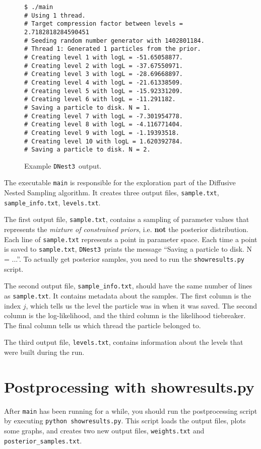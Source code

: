 \documentclass[a4paper, 11pt]{article}
\newcommand{\dnest}{{\tt DNest3}}
\begin{document}
\begin{figure}[h!]
\begin{verbatim}
$ ./main
# Using 1 thread.
# Target compression factor between levels = 2.7182818284590451
# Seeding random number generator with 1402801184.
# Thread 1: Generated 1 particles from the prior.
# Creating level 1 with logL = -51.65058877.
# Creating level 2 with logL = -37.67550971.
# Creating level 3 with logL = -28.69668897.
# Creating level 4 with logL = -21.61338509.
# Creating level 5 with logL = -15.92331209.
# Creating level 6 with logL = -11.291182.
# Saving a particle to disk. N = 1.
# Creating level 7 with logL = -7.301954778.
# Creating level 8 with logL = -4.116771404.
# Creating level 9 with logL = -1.19393518.
# Creating level 10 with logL = 1.620392784.
# Saving a particle to disk. N = 2.
\end{verbatim}
\caption{Example \dnest~output.\label{fig:output}}
\end{figure}

The executable {\tt main} is responsible for the exploration part of the
Diffusive Nested Sampling algorithm. It creates three output files,
{\tt sample.txt}, {\tt sample\_info.txt}, {\tt levels.txt}.

The first output
file, {\tt sample.txt}, contains a sampling of parameter values that
represents the {\it mixture of constrained priors}, i.e. {\bf not} the
posterior distribution. Each line of {\tt sample.txt} represents a point in
parameter space. Each time a point is saved to {\tt sample.txt}, \dnest~prints
the message ``Saving a particle to disk. N = ...''. To actually get posterior
samples, you need to run the {\tt showresults.py} script.

The second output file, {\tt sample\_info.txt}, should have the same number of
lines as {\tt sample.txt}. It contains metadata about the samples. The first
column is the index $j$, which tells us the level the particle was in when it
was saved. The second column is the log-likelihood, and the third column is
the likelihood tiebreaker. The final column tells us which thread the particle
belonged to.

The third output file, {\tt levels.txt}, contains information about the levels
that were built during the run.

\section{Postprocessing with showresults.py}
After {\tt main} has been running for
a while, you should run the postprocessing script
by executing {\tt python showresults.py}. This script loads the output files,
plots some graphs, and creates two new output files, {\tt weights.txt} and
{\tt posterior\_samples.txt}.
\end{document}
